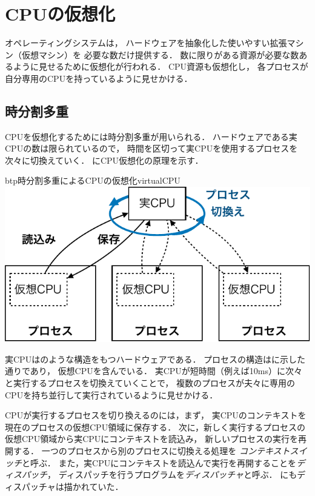 \chapter{CPUの仮想化}
オペレーティングシステムは，
ハードウェアを抽象化した使いやすい拡張マシン（仮想マシン）を
必要な数だけ提供する．
数に限りがある資源が必要な数あるように見せるために仮想化が行われる．
CPU資源も仮想化し，
各プロセスが自分専用のCPUを持っているように見せかける．

\section{時分割多重}
CPUを仮想化するためには時分割多重が用いられる．
ハードウェアである実CPUの数は限られているので，
時間を区切って実CPUを使用するプロセスを次々に切換えていく．
にCPU仮想化の原理を示す．

\begin{myfig}{btp}{時分割多重によるCPUの仮想化}{virtualCPU}
  \includegraphics[scale=0.7]{Fig/virtualCPU-crop.pdf}
\end{myfig}

実CPUはのような構造をもつハードウェアである．
プロセスの構造はに示した通りであり，
仮想CPUを含んでいる．
実CPUが短時間（例えば10ms）に次々と実行するプロセスを切換えていくことで，
複数のプロセスが夫々に専用のCPUを持ち並行して実行されているように見せかける．

CPUが実行するプロセスを切り換えるのには，まず，
実CPUのコンテキストを現在のプロセスの仮想CPU領域に保存する．
次に，新しく実行するプロセスの仮想CPU領域から実CPUにコンテキストを読込み，
新しいプロセスの実行を再開する．
一つのプロセスから別のプロセスに切換える処理を
\emph{コンテキストスイッチ}と呼ぶ．
また，実CPUにコンテキストを読込んで実行を再開することを\emph{ディスパッチ}，
ディスパッチを行うプログラムを\emph{ディスパッチャ}と呼ぶ．
にもディスパッチャは描かれていた．

